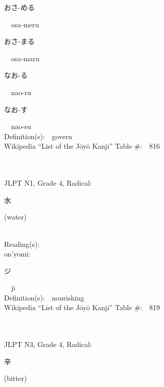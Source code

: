 \begin{multicols}{2}
{\hspace*{2em}}{\begin{CJK}{UTF8}{min} おさ-める \end{CJK}}\ \ osa-meru\ \ \\
{\hspace*{2em}}{\begin{CJK}{UTF8}{min} おさ-まる \end{CJK}}\ \ osa-maru\ \ \\
{\hspace*{2em}}{\begin{CJK}{UTF8}{min} なお-る \end{CJK}}\ \ nao-ru\ \ \\
{\hspace*{2em}}{\begin{CJK}{UTF8}{min} なお-す \end{CJK}}\ \ nao-su\ \ \\
Definition(s):\ \ govern \\
Wikipedia ``List of the J\=oy\=o Kanji'' Table \#:\ \ 816 \\
\ \ \\
{\fontsize{34pt}{40pt}  }\ \ \\  %
{JLPT N1, Grade 4, Radical:\ \ {\begin{CJK}{UTF8}{min} 水 \end{CJK}} (water) } \\
Reading(s):\ \ \\
{\hspace*{1em}}on'yomi:\ \ \\
{\hspace*{2em}}{\begin{CJK}{UTF8}{min} ジ \end{CJK}}\ \ ji\ \ \\
Definition(s):\ \ nourishing \\
Wikipedia ``List of the J\=oy\=o Kanji'' Table \#:\ \ 819 \\
\ \ \\
{\fontsize{34pt}{40pt}  }\ \ \\  %
{JLPT N3, Grade 4, Radical:\ \ {\begin{CJK}{UTF8}{min} 辛 \end{CJK}} (bitter) } \\

\end{multicols}
